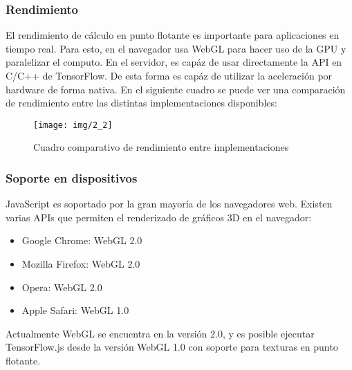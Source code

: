 

\subsubsection{Rendimiento}



El rendimiento de cálculo en punto flotante es importante para aplicaciones en tiempo real.
Para esto, en el navegador usa WebGL para hacer uso de la GPU y paralelizar el computo.
En el servidor, es capáz de usar directamente la API en C/C++ de TensorFlow. De esta forma es capáz de utilizar
la aceleración por hardware de forma nativa.
En el siguiente cuadro se puede ver una comparación de rendimiento entre las distintas implementaciones disponibles:

\begin{figure}[H]
    \texttt{[image: img/2\_2]}
    \centering
    \caption{Cuadro comparativo de rendimiento entre implementaciones  \cite{smilkovTensorFlowJsMachine2019}}
\end{figure}


\clearpage
\subsubsection{Soporte en dispositivos}

JavaScript es soportado por la gran mayoría de los
navegadores web. Existen varias APIs que permiten el renderizado de gráficos 3D en el navegador:

 \begin{itemize}
     \item Google Chrome: WebGL 2.0
    \item Mozilla Firefox: WebGL 2.0
    \item Opera: WebGL 2.0
    \item Apple Safari: WebGL 1.0
\end{itemize}

Actualmente WebGL se encuentra en la versión 2.0, y es posible ejecutar TensorFlow.js desde la versión WebGL 1.0 con soporte para texturas en punto flotante.

